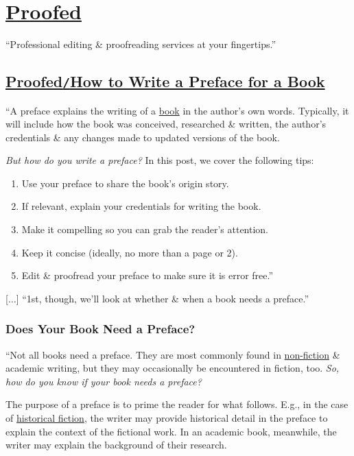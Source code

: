 \documentclass[oneside]{book}
\numberwithin{equation}{section}
\begin{document}

\chapter{\href{https://proofed.co.uk/}{Proofed}}

``Professional editing \& proofreading services at your fingertips.''

\section{\href{https://proofed.co.uk/writing-tips/how-to-write-a-preface-for-a-book/}{Proofed\texttt{/}How to Write a Preface for a Book}}
``A preface explains the writing of a \href{https://proofed.co.uk/author/book-editing-and-proofreading/}{book} in the author's own words. Typically, it will include how the book was conceived, researched \& written, the author's credentials \& any changes made to updated versions of the book.

\textit{But how do you write a preface?} In this post, we cover the following tips:
\begin{enumerate}
	\item Use your preface to share the book's origin story.
	\item If relevant, explain your credentials for writing the book.
	\item Make it compelling so you can grab the reader's attention.
	\item Keep it concise (ideally, no more than a page or 2).
	\item Edit \& proofread your preface to make sure it is error free.''
\end{enumerate}
[$\ldots$] ``1st, though, we'll look at whether \& when a book needs a preface.''

\subsection*{Does Your Book Need a Preface?}
``Not all books need a preface. They are most commonly found in \href{https://en.wikipedia.org/wiki/Nonfiction}{non-fiction} \& academic writing, but they may occasionally be encountered in fiction, too. \textit{So, how do you know if your book needs a preface?}

The purpose of a preface is to prime the reader for what follows. E.g., in the case of \href{https://en.wikipedia.org/wiki/Historical_fiction}{historical fiction}, the writer may provide historical detail in the preface to explain the context of the fictional work. In an academic book, meanwhile, the writer may explain the background of their research.
\end{document}
